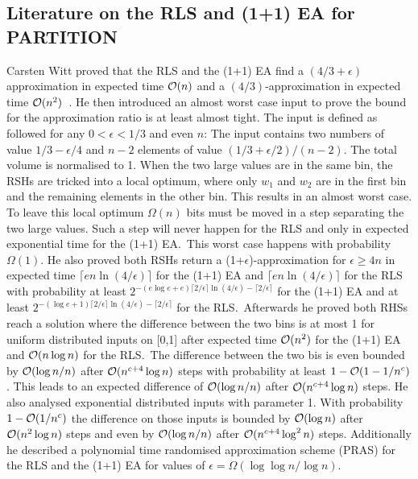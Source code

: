 \subsection{Literature on the RLS and (1+1) EA for PARTITION}
Carsten Witt proved that the RLS and the (1+1) EA find a $(4/3+\epsilon)$ approximation in expected time $\mathcal{O}(n)$ and a $(4/3)$-approximation in expected time $\mathcal{O}(n^2)$~\cite{witt2005worst}.
He then introduced an almost worst case input to prove the bound for the approximation ratio is at least almost tight.
The input is defined as followed for any $0<\epsilon<1/3$ and even $n$:\newline
The input contains two numbers of value $1/3 - \epsilon/4$ and $n-2$ elements of value $(1/3+\epsilon/2)/(n-2)$. 
The total volume is normalised to 1.
When the two large values are in the same bin, the RSHs are tricked into a local optimum, where only $w_1$ and $w_2$ are in the first bin and the remaining elements in the other bin.
This results in an almost worst case.
To leave this local optimum $\Omega(n)$ bits must be moved in a step separating the two large values.
Such a step will never happen for the RLS and only in expected exponential time for the (1+1) EA.\
This worst case happens with probability $\Omega(1)$.
He also proved both RSHs return a (1+$\epsilon$)-approximation for $\epsilon\ge4n$ in expected time \(\lceil en\ln(4/\epsilon)\rceil\) for the (1+1) EA and \(\lceil en\ln(4/\epsilon)\rceil\) for the RLS with probability at least \(2^{-(e\log{e}+e)\lceil 2/\epsilon\rceil \ln(4/\epsilon)-\lceil 2/\epsilon\rceil}\) for the (1+1) EA and at least \(2^{-(\log{e}+1)\lceil 2/\epsilon\rceil \ln(4/\epsilon)-\lceil 2/\epsilon\rceil}\) for the RLS.\
Afterwards he proved both RHSs reach a solution where the difference between the two bins is at most 1 for uniform distributed inputs on [0,1] after expected time $\mathcal{O}(n^2)$ for the (1+1) EA and $\mathcal{O}(n\log{n})$ for the RLS.\
The difference between the two bis is even bounded by $\mathcal{O}(\log{n}/n)$ after $\mathcal{O}(n^{c+4}\log{n})$ steps with probability at least $1-\mathcal{O}(1-1/n^c)$.
This leads to an expected difference of $\mathcal{O}(\log{n}/n)$ after $\mathcal{O}(n^{c+4}\log{n})$ steps.
He also analysed exponential distributed inputs with parameter 1.
With probability $1-\mathcal{O}(1/n^c)$ the difference on those inputs is bounded by $\mathcal{O}(\log{n})$ after $\mathcal{O}(n^2\log{n})$ steps and even by $\mathcal{O}(\log{n}/n)$ after $\mathcal{O}(n^{c+4}\log^2{n})$ steps.
Additionally he described a polynomial time randomised approximation scheme (PRAS) for the RLS and the (1+1) EA for values of $\epsilon=\Omega(\log{\log{}}n/\log{n})$.\newline
